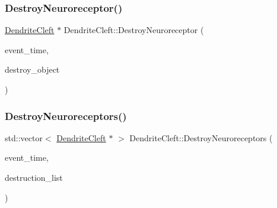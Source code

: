 \mbox{\label{classDendriteCleft_a86e9943d9d140c2a06d7e222812c9548}} 
\subsubsection{\texorpdfstring{Destroy\+Neuroreceptor()}{DestroyNeuroreceptor()}}
{\footnotesize\ttfamily \mbox{\hyperlink{classDendriteCleft}{Dendrite\+Cleft}} $\ast$ Dendrite\+Cleft\+::\+Destroy\+Neuroreceptor (\begin{DoxyParamCaption}\item[{std\+::chrono\+::time\+\_\+point$<$ \mbox{\hyperlink{universe_8h_a0ef8d951d1ca5ab3cfaf7ab4c7a6fd80}{Clock}} $>$}]{event\+\_\+time,  }\item[{\mbox{\hyperlink{classDendriteCleft}{Dendrite\+Cleft}} $\ast$}]{destroy\+\_\+object }\end{DoxyParamCaption})}

\mbox{\label{classDendriteCleft_a630e00e2d1108f2a43bcac9466e4681b}} 
\subsubsection{\texorpdfstring{Destroy\+Neuroreceptors()}{DestroyNeuroreceptors()}}
{\footnotesize\ttfamily std\+::vector$<$ \mbox{\hyperlink{classDendriteCleft}{Dendrite\+Cleft}} $\ast$ $>$ Dendrite\+Cleft\+::\+Destroy\+Neuroreceptors (\begin{DoxyParamCaption}\item[{std\+::chrono\+::time\+\_\+point$<$ \mbox{\hyperlink{universe_8h_a0ef8d951d1ca5ab3cfaf7ab4c7a6fd80}{Clock}} $>$}]{event\+\_\+time,  }\item[{std\+::vector$<$ \mbox{\hyperlink{classDendriteCleft}{Dendrite\+Cleft}} $\ast$$>$}]{destruction\+\_\+list }\end{DoxyParamCaption})}

\mbox{\label{classDendriteCleft_ac567530d9f083e1ee65d5c6484cc9fa7}} 
